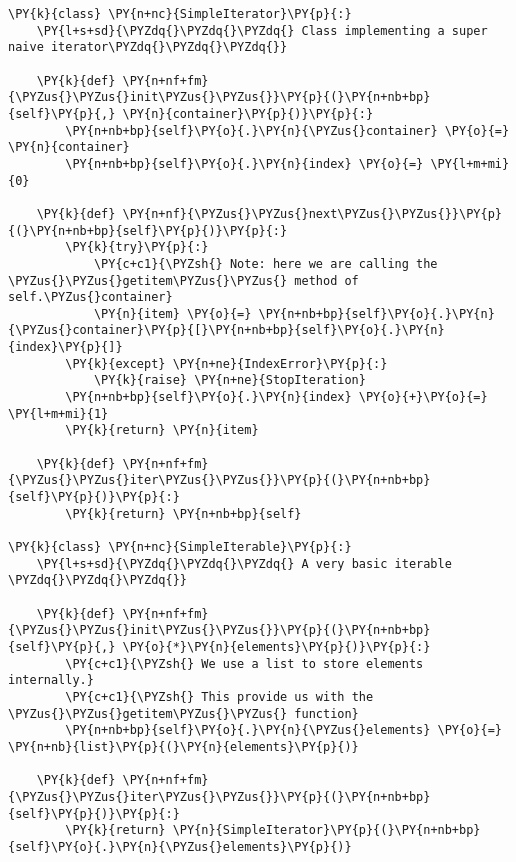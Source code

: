 \begin{Verbatim}[label=\makebox{\url{https://bitbucket.org/lbaldini/programming/src/tip/snippets/simple\_iterator.py}},commandchars=\\\{\}]
\PY{k}{class} \PY{n+nc}{SimpleIterator}\PY{p}{:}
    \PY{l+s+sd}{\PYZdq{}\PYZdq{}\PYZdq{} Class implementing a super naive iterator\PYZdq{}\PYZdq{}\PYZdq{}}
    
    \PY{k}{def} \PY{n+nf+fm}{\PYZus{}\PYZus{}init\PYZus{}\PYZus{}}\PY{p}{(}\PY{n+nb+bp}{self}\PY{p}{,} \PY{n}{container}\PY{p}{)}\PY{p}{:}
        \PY{n+nb+bp}{self}\PY{o}{.}\PY{n}{\PYZus{}container} \PY{o}{=} \PY{n}{container}
        \PY{n+nb+bp}{self}\PY{o}{.}\PY{n}{index} \PY{o}{=} \PY{l+m+mi}{0}
    
    \PY{k}{def} \PY{n+nf}{\PYZus{}\PYZus{}next\PYZus{}\PYZus{}}\PY{p}{(}\PY{n+nb+bp}{self}\PY{p}{)}\PY{p}{:}
        \PY{k}{try}\PY{p}{:}
            \PY{c+c1}{\PYZsh{} Note: here we are calling the \PYZus{}\PYZus{}getitem\PYZus{}\PYZus{} method of self.\PYZus{}container}
            \PY{n}{item} \PY{o}{=} \PY{n+nb+bp}{self}\PY{o}{.}\PY{n}{\PYZus{}container}\PY{p}{[}\PY{n+nb+bp}{self}\PY{o}{.}\PY{n}{index}\PY{p}{]}
        \PY{k}{except} \PY{n+ne}{IndexError}\PY{p}{:}
            \PY{k}{raise} \PY{n+ne}{StopIteration}
        \PY{n+nb+bp}{self}\PY{o}{.}\PY{n}{index} \PY{o}{+}\PY{o}{=} \PY{l+m+mi}{1}
        \PY{k}{return} \PY{n}{item}
    
    \PY{k}{def} \PY{n+nf+fm}{\PYZus{}\PYZus{}iter\PYZus{}\PYZus{}}\PY{p}{(}\PY{n+nb+bp}{self}\PY{p}{)}\PY{p}{:}
        \PY{k}{return} \PY{n+nb+bp}{self}
        
\PY{k}{class} \PY{n+nc}{SimpleIterable}\PY{p}{:}
    \PY{l+s+sd}{\PYZdq{}\PYZdq{}\PYZdq{} A very basic iterable \PYZdq{}\PYZdq{}\PYZdq{}}
    
    \PY{k}{def} \PY{n+nf+fm}{\PYZus{}\PYZus{}init\PYZus{}\PYZus{}}\PY{p}{(}\PY{n+nb+bp}{self}\PY{p}{,} \PY{o}{*}\PY{n}{elements}\PY{p}{)}\PY{p}{:}
        \PY{c+c1}{\PYZsh{} We use a list to store elements internally.}
        \PY{c+c1}{\PYZsh{} This provide us with the \PYZus{}\PYZus{}getitem\PYZus{}\PYZus{} function}
        \PY{n+nb+bp}{self}\PY{o}{.}\PY{n}{\PYZus{}elements} \PY{o}{=} \PY{n+nb}{list}\PY{p}{(}\PY{n}{elements}\PY{p}{)}
    
    \PY{k}{def} \PY{n+nf+fm}{\PYZus{}\PYZus{}iter\PYZus{}\PYZus{}}\PY{p}{(}\PY{n+nb+bp}{self}\PY{p}{)}\PY{p}{:}
        \PY{k}{return} \PY{n}{SimpleIterator}\PY{p}{(}\PY{n+nb+bp}{self}\PY{o}{.}\PY{n}{\PYZus{}elements}\PY{p}{)}
\end{Verbatim}